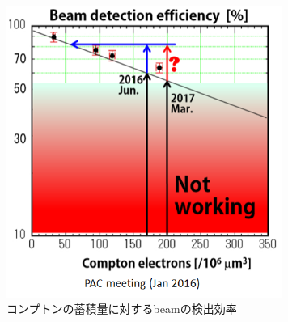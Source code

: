\documentclass[12pt,a4paper]{jarticle}
\begin{document}
\begin{figure}[htbp]
  \centering
     \includegraphics[width=90mm]{beam_efficiency_to_compton.png}
  \caption{コンプトンの蓄積量に対するbeamの検出効率\label{fig:beam_efficiency_to_compton}}
\end{figure}


\newpage
\end{document}
